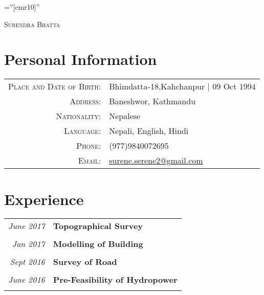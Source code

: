 \documentclass[a4paper,10pt]{article}
\begin{document}

\pagestyle{empty} %

\font\fb=''[cmr10]'' %

\par{\centering
		{\huge \textsc{Surendra} \textsc{Bhatta}
	}\bigskip\par}


\section{Personal Information}

\begin{tabular}{rl}
    \textsc{Place and Date of Birth:} & Bhimdatta-18,Kahchanpur  | 09 Oct 1994 \\
    \textsc{Address:}   & Baneshwor, Kathmandu \\
    \textsc{Nationality:} & Nepalese\\
    \textsc{Language:} & Nepali, English, Hindi\\
    \textsc{Phone:}     & (977)9840072695\\
    \textsc{Email:}     & \href{mailto:surene.serene2@gmail.com}{surene.serene2@gmail.com}\\
\end{tabular}


\section{Experience}
\begin{tabular}{r|p{11cm}}
\emph{June 2017} & \textbf{Topographical Survey}\\\multicolumn{2}{c}{} \\
\emph{Jan 2017} & \textbf{Modelling of Building}\\\multicolumn{2}{c}{} \\
\emph{Sept 2016} & \textbf{Survey of Road}\\\multicolumn{2}{c}{} \\
\emph{June 2016} & \textbf{Pre-Feasibility of Hydropower}\\\multicolumn{2}{c}{} \\
\end{tabular}
\end{document}
